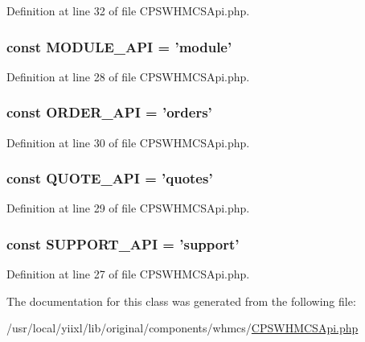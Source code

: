 Definition at line 32 of file CPSWHMCSApi.php.

\hypertarget{classCPSWHMCSApi_a72067cda85b4e918f4fe3a1292227879}{
\subsubsection[{MODULE\_\-API}]{\setlength{\rightskip}{0pt plus 5cm}const {\bf MODULE\_\-API} = 'module'}}
\label{classCPSWHMCSApi_a72067cda85b4e918f4fe3a1292227879}


Definition at line 28 of file CPSWHMCSApi.php.

\hypertarget{classCPSWHMCSApi_a550795e231e81e5688a95f44c6495d81}{
\subsubsection[{ORDER\_\-API}]{\setlength{\rightskip}{0pt plus 5cm}const {\bf ORDER\_\-API} = 'orders'}}
\label{classCPSWHMCSApi_a550795e231e81e5688a95f44c6495d81}


Definition at line 30 of file CPSWHMCSApi.php.

\hypertarget{classCPSWHMCSApi_a36cc0ed56cc1893b22c3d8578b23ee9b}{
\subsubsection[{QUOTE\_\-API}]{\setlength{\rightskip}{0pt plus 5cm}const {\bf QUOTE\_\-API} = 'quotes'}}
\label{classCPSWHMCSApi_a36cc0ed56cc1893b22c3d8578b23ee9b}


Definition at line 29 of file CPSWHMCSApi.php.

\hypertarget{classCPSWHMCSApi_ad43172e74f8477298850651b0cca3a5e}{
\subsubsection[{SUPPORT\_\-API}]{\setlength{\rightskip}{0pt plus 5cm}const {\bf SUPPORT\_\-API} = 'support'}}
\label{classCPSWHMCSApi_ad43172e74f8477298850651b0cca3a5e}


Definition at line 27 of file CPSWHMCSApi.php.



The documentation for this class was generated from the following file:\begin{DoxyCompactItemize}
\item 
/usr/local/yiixl/lib/original/components/whmcs/\hyperlink{CPSWHMCSApi_8php}{CPSWHMCSApi.php}\end{DoxyCompactItemize}
